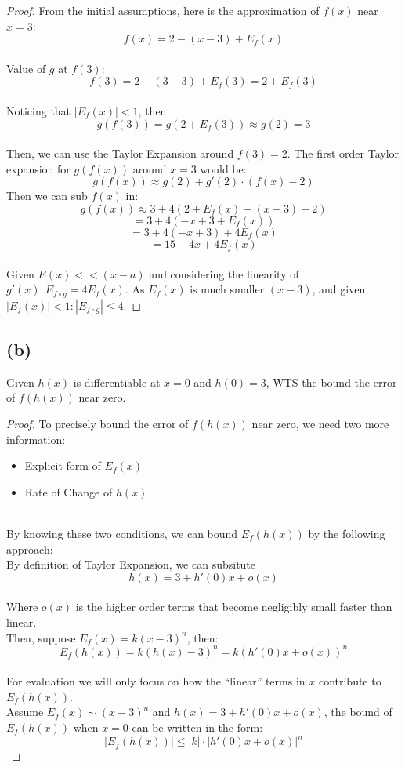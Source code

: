 \documentclass{article}
\begin{document}
\begin{proof}
    From the initial assumptions, here is the approximation of $f(x)$ near $x = 3$: 
    \[f(x) = 2 - (x - 3) + E_f(x)\]
    \\
    Value of $g$ at $f(3)$:
    \[ f(3) = 2 - (3- 3) + E_f(3) = 2 + E_f(3) \]
    \\
    Noticing that $|E_f(x)| < 1$, then
    \[ g(f(3)) = g(2 + E_f(3)) \approx g(2) = 3 \]
    \\
    Then, we can use the Taylor Expansion around $f(3) = 2$. 
    The first order Taylor expansion for $g(f(x))$ around $x = 3$ would be:
    \[ g(f(x)) \approx g(2) + g'(2) \cdot (f(x) - 2) \]
    Then we can sub $f(x)$ in:
    \[ g(f(x)) \approx 3 + 4(2 + E_f(x) - (x - 3) - 2) \]
    \[ = 3 + 4(-x + 3 + E_f(x)) \]
    \[ = 3 + 4(-x + 3) + 4E_f(x) \]
    \[ = 15 - 4x + 4E_f(x) \]
    \\
    Given $E(x) << (x - a)$  and considering the linearity of \( g'(x): E_{f \circ g} = 4E_f(x) \).
    As $E_f(x)$ is much smaller $(x - 3)$, and given $|E_f(x)| < 1: |E_{f \circ g}| \leq 4$.
\end{proof}

\newpage

\subsection*{(b)}
Given $h(x)$ is differentiable at $x = 0$ and $h(0) = 3$, WTS       the bound the
error of $f(h(x))$ near zero.
\\
\begin{proof}
    To precisely bound the error of $f(h(x))$ near zero, we need two more information:
    \begin{itemize}
        \item Explicit form of $E_f(x)$
        \item Rate of Change of $h(x)$
    \end{itemize}
    \\
    By knowing these two conditions, we can bound $E_f(h(x))$ by the following approach:
    \\
    By definition of Taylor Expansion, we can subsitute
    \[ h(x) = 3 + h'(0)x + o(x) \]
    \\
    Where $o(x)$ is the higher order terms that become negligibly small faster than linear.
    \\
    Then, suppose $E_f(x) = k(x - 3)^n$, then:
    \[ E_f(h(x)) = k(h(x) - 3)^n = k(h'(0)x + o(x))^n \]
    \\
    For evaluation we will only focus on how the ``linear'' terms in $x$ contribute to $E_f(h(x))$.
    \\
    Assume $E_f(x) \sim (x - 3)^n$ and $h(x) = 3 + h'(0)x + o(x)$, the bound of $E_f(h(x))$ when $x = 0$ can be written in the form:
    \[ |E_f(h(x))| \leq |k| \cdot |h'(0)x + o(x)|^n \]

\end{proof}
\end{document}
